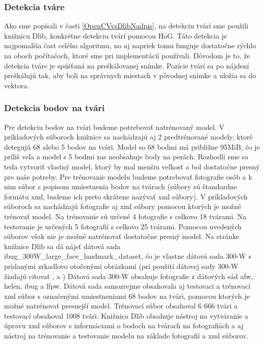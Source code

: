 \subsubsection{Detekcia tváre}\label{detekciaTvare}
Ako sme popísali v časti \ref{OpenCVvsDlibNadpis}, na detekciu tvárí sme použili knižnicu Dlib, konkrétne detekciu tvárí pomocou HoG. 
Táto detekcia je najpomalšia čast celého algoritmu, no aj napriek tomu funguje dostatočne rýchlo na oboch počítačoch, ktoré sme pri implementácií používali.
Dôvodom je to, že detekcia tváre je spúšťaná na preškálovanej snímke.
Pozície tvárí sa po nájdení preškálujú tak, aby boli na správnych miestach v pôvodnej snímke a uložia sa do vektora.

\subsubsection{Detekcia bodov na tvári}\label{detekciaBodov}
Pre detekciu bodov na tvári budeme potrebovať natrénovaný model. 
V príkladových súboroch knižnice sa nachádzajú aj 2 predtrénované modely, ktoré detegujú 68 alebo 5 bodov na tvári. 
Model so 68 bodmi má približne 95MiB, čo je príliš veľa a model s 5 bodmi zas neobsahuje body na perách.
Rozhodli sme sa teda vytvoriť vlastný model, ktorý by mal menšiu veľkosť a bol dostatočne presný pre naše potreby.
Pre trénovanie modelu budeme potrebovať fotografie osôb a k nim súbor s popisom umiestnenia bodov na tvárach (súbory sú štandardne formátu xml, budeme ich preto skrátene nazývať xml súbory).
V príkladových súboroch sa nachádzajú fotografie aj xml súbory pomocou ktorých je možné trénovať model.
Na trénovanie sú určené 4 fotografie s celkovo 18 tvárami.
Na testovanie je určených 5 fotografií s celkovo 25 tvárami.
Pomocou uvedených súborov však nie je možné natrénovať dostatočne presný model.
Na stránke knižnice Dlib sa dá nájsť dátová sada ibug\_300W\_large\_face\_landmark\_dataset, čo je vlastne dátová sada 300-W \cite{ibug} s pridanými zrkadlovo otočenými obrázkami (pri použití dátovej sady  300-W \cite{ibug} žiadajú citovať \cite{sagonas2016300}, \cite{sagonas2013300} a \cite{sagonas2013semi}) 
Dátová sada  300-W \cite{ibug} obsahuje fotografie z dátových sád afw, helen, ibug a lfpw. 
Dátová sada samozrejme obsahovala aj testovaci a trénovací xml súbor s označenými umiestneniami 68 bodov na tvári, pomocou ktorých je možné natrénovať presnejší model.
Trénovací súbor obsahoval 6 666 tvári a testovací obsahoval 1008 tvári.
Knižnica Dlib obsahuje nástroj na vytváranie a úpravu xml súborov s informáciami o bodoch na tvárach na fotografiách a aj nástroj na trénovanie a testovanie modelu na základe fotografií a xml súborov.
